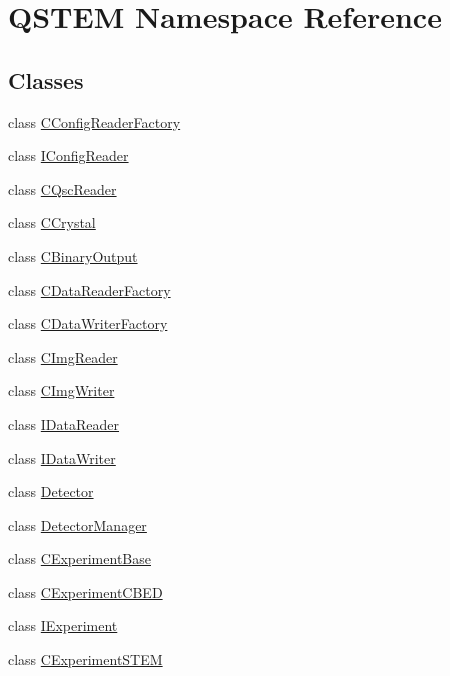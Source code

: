 \hypertarget{namespace_q_s_t_e_m}{\section{Q\-S\-T\-E\-M Namespace Reference}
\label{namespace_q_s_t_e_m}
}
\subsection*{Classes}
\begin{DoxyCompactItemize}
\item 
class \hyperlink{class_q_s_t_e_m_1_1_c_config_reader_factory}{C\-Config\-Reader\-Factory}
\item 
class \hyperlink{class_q_s_t_e_m_1_1_i_config_reader}{I\-Config\-Reader}
\item 
class \hyperlink{class_q_s_t_e_m_1_1_c_qsc_reader}{C\-Qsc\-Reader}
\item 
class \hyperlink{class_q_s_t_e_m_1_1_c_crystal}{C\-Crystal}
\item 
class \hyperlink{class_q_s_t_e_m_1_1_c_binary_output}{C\-Binary\-Output}
\item 
class \hyperlink{class_q_s_t_e_m_1_1_c_data_reader_factory}{C\-Data\-Reader\-Factory}
\item 
class \hyperlink{class_q_s_t_e_m_1_1_c_data_writer_factory}{C\-Data\-Writer\-Factory}
\item 
class \hyperlink{class_q_s_t_e_m_1_1_c_img_reader}{C\-Img\-Reader}
\item 
class \hyperlink{class_q_s_t_e_m_1_1_c_img_writer}{C\-Img\-Writer}
\item 
class \hyperlink{class_q_s_t_e_m_1_1_i_data_reader}{I\-Data\-Reader}
\item 
class \hyperlink{class_q_s_t_e_m_1_1_i_data_writer}{I\-Data\-Writer}
\item 
class \hyperlink{class_q_s_t_e_m_1_1_detector}{Detector}
\item 
class \hyperlink{class_q_s_t_e_m_1_1_detector_manager}{Detector\-Manager}
\item 
class \hyperlink{class_q_s_t_e_m_1_1_c_experiment_base}{C\-Experiment\-Base}
\item 
class \hyperlink{class_q_s_t_e_m_1_1_c_experiment_c_b_e_d}{C\-Experiment\-C\-B\-E\-D}
\item 
class \hyperlink{class_q_s_t_e_m_1_1_i_experiment}{I\-Experiment}
\item 
class \hyperlink{class_q_s_t_e_m_1_1_c_experiment_s_t_e_m}{C\-Experiment\-S\-T\-E\-M}

\end{DoxyCompactItemize}
